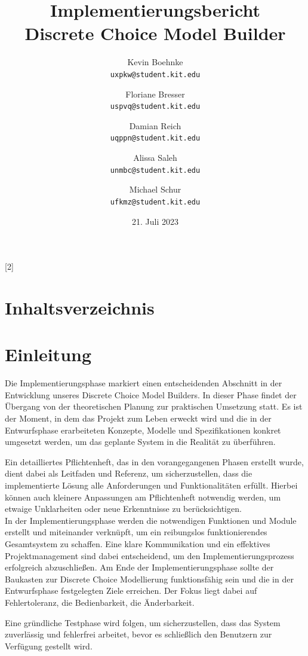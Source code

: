 \documentclass{article}
\title{Implementierungsbericht \\ \large Discrete Choice Model Builder}
\author{Kevin Boehnke \\ \texttt{uxpkw@student.kit.edu}
\and Floriane Bresser \\ \texttt{uspvq@student.kit.edu}
\and Damian Reich \\ \texttt{uqppn@student.kit.edu}
\and Alissa Saleh \\ \texttt{unmbc@student.kit.edu}
\and Michael Schur \\ \texttt{ufkmz@student.kit.edu}}
\date{21. Juli 2023}
\begin{document}
\maketitle
\thispagestyle{empty}
\newpage
\startcontents[maintableofcontents]
[2]{\section*{Inhaltsverzeichnis}}
\thispagestyle{empty}
\newpage
{}

\section{Einleitung}

Die Implementierungsphase markiert einen entscheidenden Abschnitt in der Entwicklung unseres Discrete Choice Model Builders. In dieser Phase findet der Übergang von der theoretischen Planung zur praktischen Umsetzung statt. Es ist der Moment, in dem das Projekt zum Leben erweckt wird und die in der Entwurfsphase erarbeiteten Konzepte, Modelle und Spezifikationen konkret umgesetzt werden, um das geplante System in die Realität zu überführen.

Ein detailliertes Pflichtenheft, das in den vorangegangenen Phasen erstellt wurde, dient dabei als Leitfaden und Referenz, um sicherzustellen, dass die implementierte Lösung alle Anforderungen und Funktionalitäten erfüllt. Hierbei können auch kleinere Anpassungen am Pflichtenheft notwendig werden, um etwaige Unklarheiten oder neue Erkenntnisse zu berücksichtigen. \\

In der Implementierungsphase werden die notwendigen Funktionen und Module erstellt und miteinander verknüpft, um ein reibungslos funktionierendes Gesamtsystem zu schaffen. Eine klare Kommunikation und ein effektives Projektmanagement sind dabei entscheidend, um den Implementierungsprozess erfolgreich abzuschließen. Am Ende der Implementierungsphase sollte der Baukasten zur Discrete Choice Modellierung funktionsfähig sein und die in der Entwurfsphase festgelegten Ziele erreichen. Der Fokus liegt dabei auf Fehlertoleranz, die Bedienbarkeit, die Änderbarkeit.

Eine gründliche Testphase wird folgen, um sicherzustellen, dass das System zuverlässig und fehlerfrei arbeitet, bevor es schließlich den Benutzern zur Verfügung gestellt wird. \\
\end{document}
